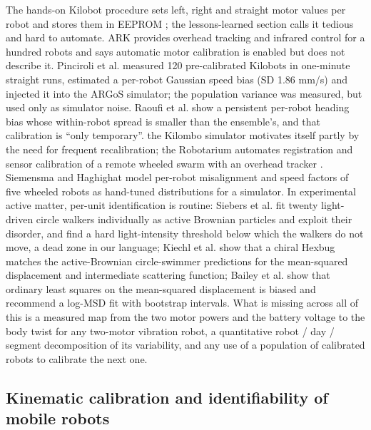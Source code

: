 The hands-on Kilobot procedure sets left, right and straight motor values per robot and
stores them in EEPROM \cite{rubenstein2014kilobot}; the lessons-learned
section calls it tedious and hard to automate. ARK \cite{reina2017ark}
provides overhead tracking and infrared control for a hundred robots and
says automatic motor calibration is enabled but does not describe it.
Pinciroli et al. \cite{pinciroli2018kilobots} measured 120
pre-calibrated Kilobots in one-minute straight runs, estimated a
per-robot Gaussian speed bias (SD 1.86 mm/s) and injected it into the
ARGoS simulator; the population variance was measured, but used only as
simulator noise. Raoufi et al. \cite{raoufi2023individuality} show a
persistent per-robot heading bias whose within-robot spread is smaller
than the ensemble's, and that calibration is ``only temporary''. the Kilombo
simulator \cite{jansson2015kilombo} motivates itself partly by the need
for frequent recalibration; the Robotarium automates registration and sensor calibration of a remote
wheeled swarm with an overhead tracker \cite{pickem2016robotarium}.
Siemensma and Haghighat \cite{siemensma2024bayesian} model per-robot
misalignment and speed factors of five wheeled robots as hand-tuned
distributions for a simulator. In experimental active matter, per-unit
identification is routine: Siebers et al. \cite{siebers2023disorder}
fit twenty light-driven circle walkers individually as active Brownian
particles and exploit their disorder, and find a hard light-intensity
threshold below which the walkers do not move, a dead zone in our
language; Kiechl et al. \cite{kiechl2026chiral} show that a chiral
Hexbug matches the active-Brownian circle-swimmer predictions for the
mean-squared displacement and intermediate scattering function; Bailey
et al. \cite{bailey2022logit} show that ordinary least squares on the
mean-squared displacement is biased and recommend a log-MSD fit with
bootstrap intervals. What is missing across all of this is a measured map from
the two motor powers and the battery voltage to the body twist for any
two-motor vibration robot, a quantitative robot / day / segment
decomposition of its variability, and any use of a population of
calibrated robots to calibrate the next one.

\subsection{Kinematic calibration and identifiability of mobile
robots}

